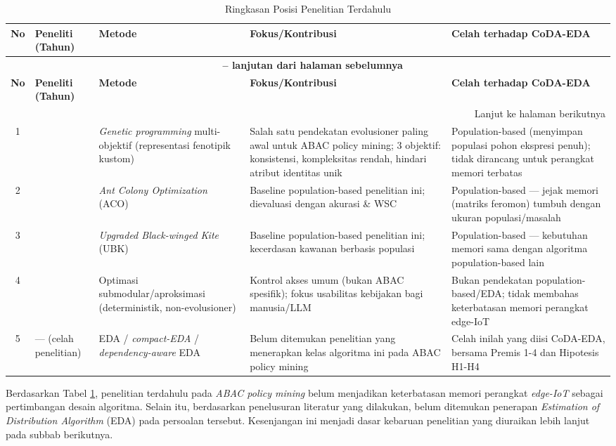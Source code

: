 \begin{longtable}{|c|p{2.5cm}|p{3cm}|p{3cm}|p{3cm}|}
\caption{Ringkasan Posisi Penelitian Terdahulu}
\label{tab:posisi-penelitian} \\
\hline
\textbf{No} & \textbf{Peneliti (Tahun)} & \textbf{Metode} & \textbf{Fokus/Kontribusi} & \textbf{Celah terhadap CoDA-EDA} \\
\hline
\endfirsthead

\multicolumn{5}{c}{{\bfseries \tablename\ \thetable{} -- lanjutan dari halaman sebelumnya}} \\
\hline
\textbf{No} & \textbf{Peneliti (Tahun)} & \textbf{Metode} & \textbf{Fokus/Kontribusi} & \textbf{Celah terhadap CoDA-EDA} \\
\hline
\endhead

\hline
\multicolumn{5}{r}{Lanjut ke halaman berikutnya} \\
\endfoot

\hline
\endlastfoot

1 & \textcite{gaspar-cunha_evolutionary_2015} & \textit{Genetic programming} multi-objektif (representasi fenotipik kustom) & Salah satu pendekatan evolusioner paling awal untuk ABAC policy mining; 3 objektif: konsistensi, kompleksitas rendah, hindari atribut identitas unik & Population-based (menyimpan populasi pohon ekspresi penuh); tidak dirancang untuk perangkat memori terbatas \\
\hline
2 & \textcite{shang_abac_2024} & \textit{Ant Colony Optimization} (ACO) & Baseline population-based penelitian ini; dievaluasi dengan akurasi \& WSC & Population-based --- jejak memori (matriks feromon) tumbuh dengan ukuran populasi/masalah \\
\hline
3 & \textcite{li_attribute_2026} & \textit{Upgraded Black-winged Kite} (UBK) & Baseline population-based penelitian ini; kecerdasan kawanan berbasis populasi & Population-based --- kebutuhan memori sama dengan algoritma population-based lain \\
\hline
4 & \textcite{guo_--fly_2025} & Optimasi submodular/aproksimasi (deterministik, non-evolusioner) & Kontrol akses umum (bukan ABAC spesifik); fokus usabilitas kebijakan bagi manusia/LLM & Bukan pendekatan population-based/EDA; tidak membahas keterbatasan memori perangkat edge-IoT \\
\hline
5 & --- (celah penelitian) & EDA / \textit{compact-EDA} / \textit{dependency-aware} EDA & Belum ditemukan penelitian yang menerapkan kelas algoritma ini pada ABAC policy mining & Celah inilah yang diisi CoDA-EDA, bersama Premis 1-4 dan Hipotesis H1-H4 \\
\hline

\end{longtable}

Berdasarkan Tabel \ref{tab:posisi-penelitian}, penelitian terdahulu pada \textit{ABAC policy mining} belum menjadikan keterbatasan memori perangkat \textit{edge-IoT} sebagai pertimbangan desain algoritma. 
Selain itu, berdasarkan penelusuran literatur yang dilakukan, belum ditemukan penerapan \textit{Estimation of Distribution Algorithm} (EDA) pada persoalan tersebut. 
Kesenjangan ini menjadi dasar kebaruan penelitian yang diuraikan lebih lanjut pada subbab berikutnya.